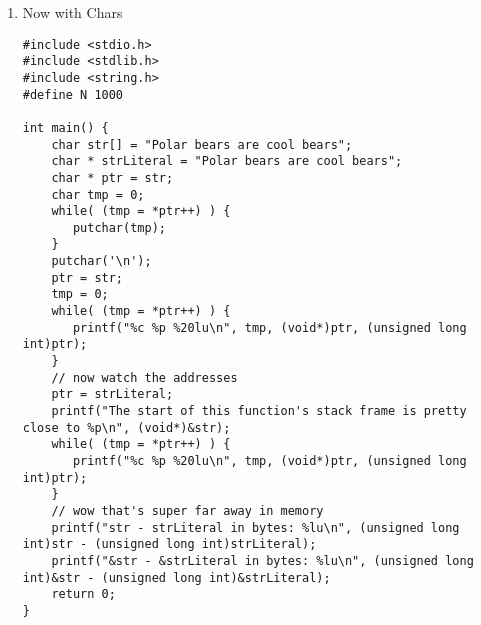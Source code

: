 \documentclass[11pt]{article}
\begin{document}
\begin{enumerate}
\item Now with Chars
\label{sec:orga1d8d86}

\begin{verbatim}
#include <stdio.h>
#include <stdlib.h>
#include <string.h>
#define N 1000

int main() {
    char str[] = "Polar bears are cool bears";
    char * strLiteral = "Polar bears are cool bears";
    char * ptr = str;
    char tmp = 0;
    while( (tmp = *ptr++) ) {
       putchar(tmp);
    }
    putchar('\n');
    ptr = str;
    tmp = 0;
    while( (tmp = *ptr++) ) {
       printf("%c %p %20lu\n", tmp, (void*)ptr, (unsigned long int)ptr);
    }
    // now watch the addresses
    ptr = strLiteral;
    printf("The start of this function's stack frame is pretty close to %p\n", (void*)&str);
    while( (tmp = *ptr++) ) {
       printf("%c %p %20lu\n", tmp, (void*)ptr, (unsigned long int)ptr);
    }
    // wow that's super far away in memory
    printf("str - strLiteral in bytes: %lu\n", (unsigned long int)str - (unsigned long int)strLiteral);
    printf("&str - &strLiteral in bytes: %lu\n", (unsigned long int)&str - (unsigned long int)&strLiteral);
    return 0;
}
\end{verbatim}


\end{enumerate}
\end{document}
